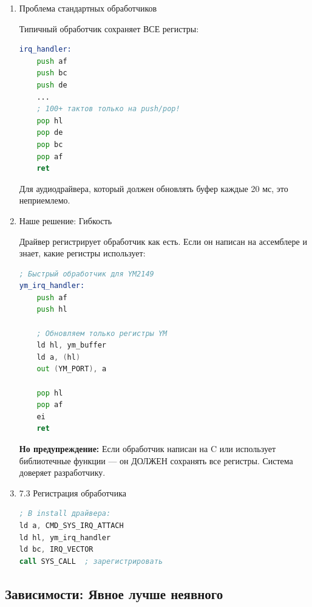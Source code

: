 \documentclass[11pt,a4paper]{scrartcl}
\begin{document}
\begin{enumerate}
\item Проблема стандартных обработчиков
\label{sec:org17f18bb}

Типичный обработчик сохраняет ВСЕ регистры:

\begin{lstlisting}[language=asm,numbers=none]
irq_handler:
    push af
    push bc
    push de
    ...
    ; 100+ тактов только на push/pop!
    pop hl
    pop de
    pop bc
    pop af
    ret
\end{lstlisting}

Для аудиодрайвера, который должен обновлять буфер каждые 20 мс, это неприемлемо.
\item Наше решение: Гибкость
\label{sec:orgedc3a68}

Драйвер регистрирует обработчик как есть. Если он написан на ассемблере и знает, какие регистры использует:

\begin{lstlisting}[language=asm,numbers=none]
; Быстрый обработчик для YM2149
ym_irq_handler:
    push af
    push hl
    
    ; Обновляем только регистры YM
    ld hl, ym_buffer
    ld a, (hl)
    out (YM_PORT), a
    
    pop hl
    pop af
    ei
    ret
\end{lstlisting}

\textbf{Но предупреждение:} Если обработчик написан на C или использует библиотечные функции — он ДОЛЖЕН сохранять все регистры. Система доверяет разработчику.
\item 7.3 Регистрация обработчика
\label{sec:org2f6f7d3}

\begin{lstlisting}[language=asm,numbers=none]
; В install драйвера:
ld a, CMD_SYS_IRQ_ATTACH
ld hl, ym_irq_handler
ld bc, IRQ_VECTOR
call SYS_CALL  ; зарегистрировать
\end{lstlisting}
\end{enumerate}
\subsection{Зависимости: Явное лучше неявного}
\label{sec:orga188e32}
\end{document}
